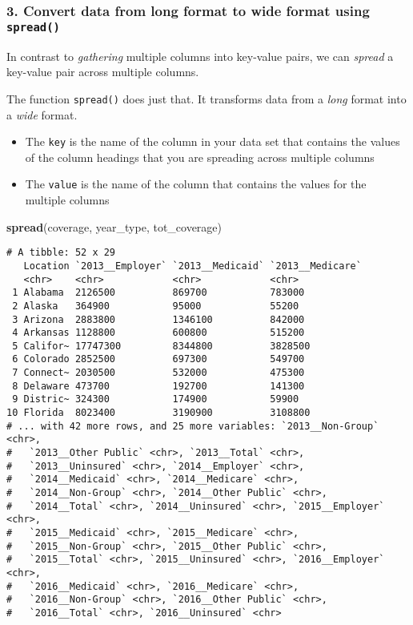 \documentclass[]{article}
\newenvironment{Shaded}{\begin{snugshade}}{\end{snugshade}}
\newcommand{\KeywordTok}[1]{\textcolor[rgb]{0.13,0.29,0.53}{\textbf{#1}}}
\newcommand{\NormalTok}[1]{#1}
\providecommand{\tightlist}{%
  \setlength{\itemsep}{0pt}\setlength{\parskip}{0pt}}
\begin{document}
\hypertarget{convert-data-from-long-format-to-wide-format-using-spread}{%
\subsubsection{\texorpdfstring{3. Convert data from long format to wide
format using
\texttt{spread()}}{3. Convert data from long format to wide format using spread()}}\label{convert-data-from-long-format-to-wide-format-using-spread}}

In contrast to \emph{gathering} multiple columns into key-value pairs,
we can \emph{spread} a key-value pair across multiple columns.

The function \texttt{spread()} does just that. It transforms data from a
\emph{long} format into a \emph{wide} format.

\begin{itemize}
\tightlist
\item
  The \texttt{key} is the name of the column in your data set that
  contains the values of the column headings that you are spreading
  across multiple columns
\item
  The \texttt{value} is the name of the column that contains the values
  for the multiple columns
\end{itemize}

\begin{Shaded}
\begin{Highlighting}[]
\KeywordTok{spread}\NormalTok{(coverage, year_type, tot_coverage)}
\end{Highlighting}
\end{Shaded}

\begin{verbatim}
# A tibble: 52 x 29
   Location `2013__Employer` `2013__Medicaid` `2013__Medicare`
   <chr>    <chr>            <chr>            <chr>           
 1 Alabama  2126500          869700           783000          
 2 Alaska   364900           95000            55200           
 3 Arizona  2883800          1346100          842000          
 4 Arkansas 1128800          600800           515200          
 5 Califor~ 17747300         8344800          3828500         
 6 Colorado 2852500          697300           549700          
 7 Connect~ 2030500          532000           475300          
 8 Delaware 473700           192700           141300          
 9 Distric~ 324300           174900           59900           
10 Florida  8023400          3190900          3108800         
# ... with 42 more rows, and 25 more variables: `2013__Non-Group` <chr>,
#   `2013__Other Public` <chr>, `2013__Total` <chr>,
#   `2013__Uninsured` <chr>, `2014__Employer` <chr>,
#   `2014__Medicaid` <chr>, `2014__Medicare` <chr>,
#   `2014__Non-Group` <chr>, `2014__Other Public` <chr>,
#   `2014__Total` <chr>, `2014__Uninsured` <chr>, `2015__Employer` <chr>,
#   `2015__Medicaid` <chr>, `2015__Medicare` <chr>,
#   `2015__Non-Group` <chr>, `2015__Other Public` <chr>,
#   `2015__Total` <chr>, `2015__Uninsured` <chr>, `2016__Employer` <chr>,
#   `2016__Medicaid` <chr>, `2016__Medicare` <chr>,
#   `2016__Non-Group` <chr>, `2016__Other Public` <chr>,
#   `2016__Total` <chr>, `2016__Uninsured` <chr>
\end{verbatim}
\end{document}
